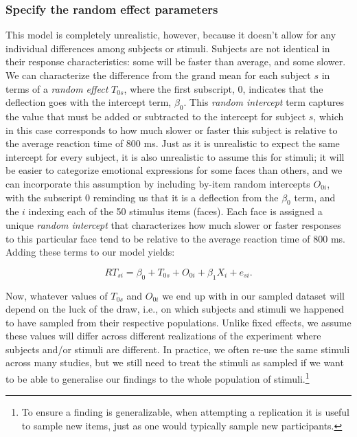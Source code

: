 \documentclass[
  english,
  doc,floatsintext]{apa6}
\begin{document}
\hypertarget{specify-the-random-effect-parameters}{%
\subsubsection{Specify the random effect parameters}\label{specify-the-random-effect-parameters}}

This model is completely unrealistic, however, because it doesn't allow for any individual differences among subjects or stimuli. Subjects are not identical in their response characteristics: some will be faster than average, and some slower. We can characterize the difference from the grand mean for each subject \(s\) in terms of a \emph{random effect} \(T_{0s}\), where the first subscript, 0, indicates that the deflection goes with the intercept term, \(\beta_0\). This \emph{random intercept} term captures the value that must be added or subtracted to the intercept for subject \(s\), which in this case corresponds to how much slower or faster this subject is relative to the average reaction time of 800 ms. Just as it is unrealistic to expect the same intercept for every subject, it is also unrealistic to assume this for stimuli; it will be easier to categorize emotional expressions for some faces than others, and we can incorporate this assumption by including by-item random intercepts \(O_{0i}\), with the subscript 0 reminding us that it is a deflection from the \(\beta_0\) term, and the \(i\) indexing each of the 50 stimulus items (faces). Each face is assigned a unique \emph{random intercept} that characterizes how much slower or faster responses to this particular face tend to be relative to the average reaction time of 800 ms. Adding these terms to our model yields:

\begin{equation}
RT_{si} = \beta_0 + T_{0s} + O_{0i} + \beta_1 X_i + e_{si} .
\end{equation}

Now, whatever values of \(T_{0s}\) and \(O_{0i}\) we end up with in our sampled dataset will depend on the luck of the draw, i.e., on which subjects and stimuli we happened to have sampled from their respective populations. Unlike fixed effects, we assume these values will differ across different realizations of the experiment where subjects and/or stimuli are different. In practice, we often re-use the same stimuli across many studies, but we still need to treat the stimuli as sampled if we want to be able to generalise our findings to the whole population of stimuli.\footnote{To ensure a finding is generalizable, when attempting a replication it is useful to sample new items, just as one would typically sample new participants.}
\end{document}
